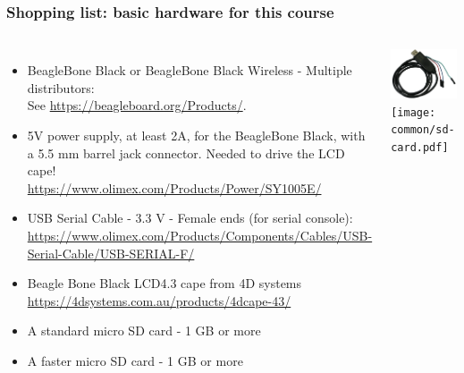 \begin{frame}
\frametitle{Shopping list: basic hardware for this course}
  \begin{columns}
    \begin{itemize}
      \item BeagleBone Black or BeagleBone Black Wireless - Multiple distributors: \\
	    See \url{https://beagleboard.org/Products/}.
      \item 5V power supply, at least 2A, for the BeagleBone Black, with a 5.5 mm barrel
            jack connector. Needed to drive the LCD cape!\\
	    \url{https://www.olimex.com/Products/Power/SY1005E/}
      \item USB Serial Cable - 3.3 V - Female ends (for serial console): \\
	    \url{https://www.olimex.com/Products/Components/Cables/USB-Serial-Cable/USB-SERIAL-F/}
      \item Beagle Bone Black LCD4.3 cape from 4D systems\\
            \url{https://4dsystems.com.au/products/4dcape-43/}
      \item A standard micro SD card - 1 GB or more
      \item A faster micro SD card - 1 GB or more
    \end{itemize}
    \includegraphics[height=0.20\textheight]{common/usb-serial-cable-female.png} \\
    \texttt{[image: common/sd-card.pdf]} \\
  \end{columns}
\end{frame}

